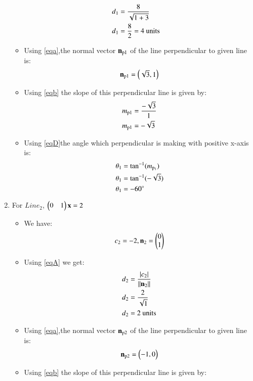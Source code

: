 \documentclass[journal,12pt,twocolumn]{IEEEtran}
\begin{document}
\begin{enumerate}
\begin{itemize}
\begin{align}
\\
d\textsubscript{1}&=\frac{8}{\sqrt{1+3}} 
\\
d\textsubscript{1}&=\frac{8}{2}=4\text{ units}
\end{align}
\item Using \eqref{eqa},the normal vector $\vec{n\textsubscript{p1}}$ of the line perpendicular to given line is: 
\begin{align}
    \vec{n\textsubscript{p1}}=\myvec{\sqrt{3},1}
\end{align}
\item Using \eqref{eqb} the slope of this perpendicular line is given by:
\begin{align}
  m\textsubscript{p1}&=\frac{-\sqrt{3}}{1}
  \\
  m\textsubscript{p1}&=-\sqrt{3}
\end{align}
\item Using \eqref{eqD}the angle which perpendicular is making with positive x-axis is:
\begin{align}
    \theta\textsubscript{1} &= \tan^{-1}( m\textsubscript{p\textsubscript{1}})
    \\
    \theta\textsubscript{1} &=\tan^{-1}(-\sqrt{3})
    \\
 \theta\textsubscript{1} &= -60\degree
\end{align}
\end{itemize}
\item For $Line_2$, $\myvec{0&1}\vec{x} =2$
\begin{itemize}
\item We have:
\begin{align}
 c\textsubscript{2}=-2 ,{\vec{n\textsubscript{2}}}=\myvec{0\\1}   
\end{align}
\item Using \eqref{eqA} we get:
\begin{align}
d\textsubscript{2}&=\frac { \left| c\textsubscript{2} \right| }{\norm{\vec{n\textsubscript{2}}}}
\\
d\textsubscript{2}&=\frac{2}{\sqrt{1}} 
\\
d\textsubscript{2}&=2 \text{ units}
\end{align}
\item Using \eqref{eqa},the normal vector $\vec{n\textsubscript{p2}}$ of the line perpendicular to given line is: 
\begin{align}
    \vec{n\textsubscript{p2}}=\myvec{-1,0}
\end{align}
\item Using \eqref{eqb} the slope of this perpendicular line is given by:

\end{itemize}
\end{enumerate}
\end{document}
